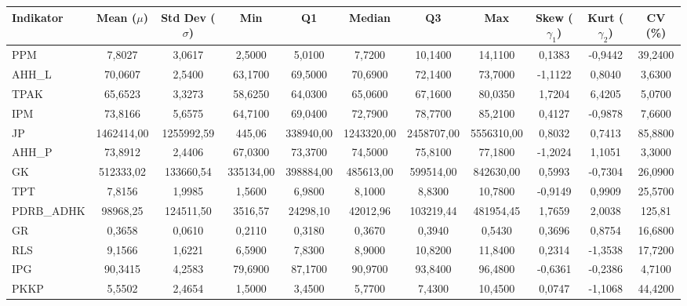 \begin{adjustbox}{max width=\textwidth}
\small
\begin{tabular}{|>{\centering\arraybackslash}p{2.5cm}|c|c|c|c|c|c|c|c|c|c|}
\hline
\textbf{Indikator} & \textbf{Mean ($\mu$)} & \textbf{Std Dev ($\sigma$)} & \textbf{Min} & \textbf{Q1} & \textbf{Median} & \textbf{Q3} & \textbf{Max} & \textbf{Skew ($\gamma_1$)} & \textbf{Kurt ($\gamma_2$)} & \textbf{CV (\%)} \\
\hline
PPM & 7,8027 & 3,0617 & 2,5000 & 5,0100 & 7,7200 & 10,1400 & 14,1100 & 0,1383 & -0,9442 & 39,2400 \\
AHH\_L & 70,0607 & 2,5400 & 63,1700 & 69,5000 & 70,6900 & 72,1400 & 73,7000 & -1,1122 & 0,8040 & 3,6300 \\
TPAK & 65,6523 & 3,3273 & 58,6250 & 64,0300 & 65,0600 & 67,1600 & 80,0350 & 1,7204 & 6,4205 & 5,0700 \\
IPM & 73,8166 & 5,6575 & 64,7100 & 69,0400 & 72,7900 & 78,7700 & 85,2100 & 0,4127 & -0,9878 & 7,6600 \\
JP & 1462414,00 & 1255992,59 & 445,06 & 338940,00 & 1243320,00 & 2458707,00 & 5556310,00 & 0,8032 & 0,7413 & 85,8800 \\
AHH\_P & 73,8912 & 2,4406 & 67,0300 & 73,3700 & 74,5000 & 75,8100 & 77,1800 & -1,2024 & 1,1051 & 3,3000 \\
GK & 512333,02 & 133660,54 & 335134,00 & 398884,00 & 485613,00 & 599514,00 & 842630,00 & 0,5993 & -0,7304 & 26,0900 \\
TPT & 7,8156 & 1,9985 & 1,5600 & 6,9800 & 8,1000 & 8,8300 & 10,7800 & -0,9149 & 0,9909 & 25,5700 \\
PDRB\_ADHK & 98968,25 & 124511,50 & 3516,57 & 24298,10 & 42012,96 & 103219,44 & 481954,45 & 1,7659 & 2,0038 & 125,81 \\
GR & 0,3658 & 0,0610 & 0,2110 & 0,3180 & 0,3670 & 0,3940 & 0,5430 & 0,3696 & 0,8754 & 16,6800 \\
RLS & 9,1566 & 1,6221 & 6,5900 & 7,8300 & 8,9000 & 10,8200 & 11,8400 & 0,2314 & -1,3538 & 17,7200 \\
IPG & 90,3415 & 4,2583 & 79,6900 & 87,1700 & 90,9700 & 93,8400 & 96,4800 & -0,6361 & -0,2386 & 4,7100 \\
PKKP & 5,5502 & 2,4654 & 1,5000 & 3,4500 & 5,7700 & 7,4300 & 10,4500 & 0,0747 & -1,1068 & 44,4200 \\
\hline
\end{tabular}
\end{adjustbox}
